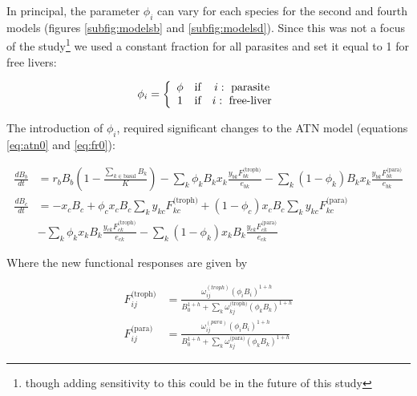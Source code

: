 \documentclass[11pt]{amsart}
\begin{document}
In principal, the parameter $\phi_i$ can vary for each species for the second and fourth models (figures \ref{subfig:modelsb} and \ref{subfig:modelsd}).  Since this was not a focus of the study\footnote{though adding sensitivity to this could be in the future of this study} we used a constant fraction for all parasites and set it equal to 1 for free livers:

\begin{equation}
\phi_i = 
\left\{
\begin{array}{c c c}
\phi & \text{if} & i:\text{ parasite}\\
1 & \text{if} & i:\text{ free-liver}\\
\end{array}
\right.\label{phidef}
\end{equation}

The introduction of $\phi_i$, required significant changes to the ATN model (equations \ref{eq:atn0} and \ref{eq:fr0}):


\begin{subequations}\label{eq:atn1}
\begin{align}
\frac{dB_{b}}{dt} &= r_bB_b\left(1-\frac{\sum_{k\in\text{basal}}B_k}{K}\right) - \sum_k\phi_kB_kx_k\frac{y_{bk}F_{bk}^\text{(troph)}}{e_{bk}} - \sum_k(1-\phi_k)B_kx_k\frac{y_{bk}F^\text{(para)}_{bk}}{e_{bk}}\label{subeq:basal1} \\ 
\frac{dB_{c}}{dt} &= -x_cB_c + \phi_cx_cB_c\sum_ky_{kc}F^\text{(troph)}_{kc} + (1-\phi_c)x_cB_c\sum_ky_{kc}F^\text{(para)}_{kc} \label{subeq:con1}\\ 
& - \sum_k \phi_kx_kB_k\frac{y_{ck}F^\text{(troph)}_{ck}}{e_{ck}} - \sum_k (1-\phi_k)x_kB_k\frac{y_{ck}F^\text{(para)}_{ck}}{e_{ck}}\nonumber
\end{align}
\end{subequations}

Where the new functional responses are given by 

\begin{subequations}\label{eq:fr1}
\begin{align}F_{ij}^\text{(troph)} &= \frac{\omega_{ij}^{(troph)}(\phi_iB_i)^{1+h}}{B_0^{1+h} + \sum_k\omega^\text{(troph)}_{kj}(\phi_kB_k)^{1+h}} \label{subeq:fr1troph}\\
F_{ij}^\text{(para)} &= \frac{\omega_{ij}^{(para)}(\phi_iB_i)^{1+h}}{B_0^{1+h} + \sum_k\omega^\text{(para)}_{kj}(\phi_kB_k)^{1+h}} \label{subeq:fr1para}
\end{align}
\end{subequations}
\end{document}
